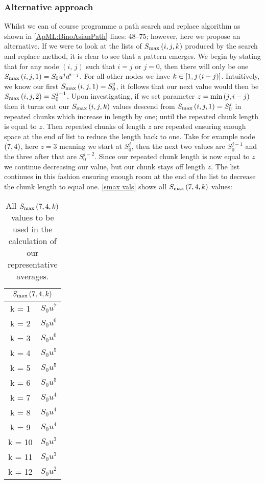 \subsubsection{Alternative approach}

Whilst we can of course programme a path search and replace algorithm as shown in \autoref{ApML:BinoAsianPath} lines: 48--75; however, here we propose an alternative. If we were to look at the lists of \(S_\text{max}\left({i},{j},{k}\right)\) produced by the search and replace method, it is clear to see that a pattern emerges. We begin by stating that for any node \((i,\,j)\) such that \(i = j\) or \(j = 0\), then there will only be one \(S_\text{max}\left({i},{j},{1}\right) = S_0u^j d^{i-j}\). 
\nline{}
For all other nodes we have \(k \in [1, j\left(i-j\right)]\). Intuitively, we know our first \(S_\text{max}\left({i},{j},{1}\right) = S_0^j\), it follows that our next value would then be \(S_\text{max}\left({i},{j},{2}\right) = S_0^{j-1}\). Upon investigating, if we set parameter \(z = \min\left(j, i - j\right)\) then it turns out our \(S_\text{max}\left({i},{j},{k}\right)\) values descend from \(S_\text{max}\left({i},{j},{1}\right) = S_0^j\) in repeated chunks which increase in length by one; until the repeated chunk length is equal to \(z\). Then repeated chunks of length \(z\) are repeated ensuring enough space at the end of list to reduce the length back to one. 
\nline{}
Take for example node \(\left(7,4\right)\), here \(z = 3\) meaning we start at \(S_0^j\), then the next two values are \(S_0^{j-1}\) and the three after that are \(S_0^{j-2}\). Since our repeated chunk length is now equal to \(z\) we continue decreasing our value, but our chunk stays off length \(z\). The list continues in this fashion ensuring enough room at the end of the list to decrease the chunk length to equal one. \autoref{smax vals} shows all \(S_\text{max}\left({7},{4},{k}\right)\) values:

\begin{table}
    \centering
    \begin{tabular}{cc}
        \multicolumn{2}{c}{\(S_\text{max}\left({7},{4},{k}\right)\)} \\
        \midrule
        k = 1 & \(S_0u^{7} \) \\
        k = 2 & \(S_0u^{6} \) \\
        k = 3 & \(S_0u^{6} \) \\
        k = 4 & \(S_0u^{5} \) \\
        k = 5 & \(S_0u^{5} \) \\
        k = 6 & \(S_0u^{5} \) \\
        k = 7 & \(S_0u^{4} \) \\
        k = 8 & \(S_0u^{4} \) \\
        k = 9 & \(S_0u^{4} \) \\
        k = 10 & \(S_0u^{3} \) \\
        k = 11 & \(S_0u^{3} \) \\
        k = 12 & \(S_0u^{2} \) \\
        \bottomrule
    \end{tabular}
    \caption{All \(S_\text{max}\left({7},{4},{k}\right)\) values to be used in the calculation of our representative averages.}\label{smax vals}
\end{table}

